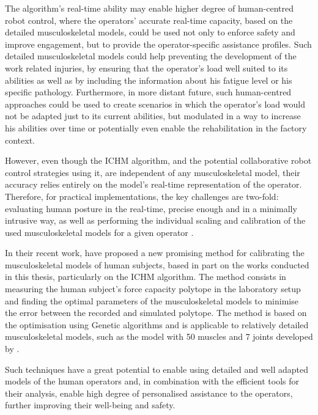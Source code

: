 The algorithm's real-time ability may enable higher degree of human-centred robot control, where the operators' accurate real-time capacity, based on the detailed musculoskeletal models, could be used not only to enforce safety and improve engagement, but to provide the operator-specific assistance profiles. Such detailed musculoskeletal models could help preventing the development of the work related injuries, by ensuring that the operator's load well suited to its abilities as well as by including the information about his fatigue level \cite{Bolghanabadi2014fatigue} or his specific pathology. Furthermore, in more distant future, such human-centred approaches could be used to create scenarios in which the operator's load would not be adapted just to its current abilities, but modulated in a way to increase his abilities over time or potentially even enable the rehabilitation in the factory context. 

However, even though the ICHM algorithm, and the potential collaborative robot control strategies using it, are independent of any musculoskeletal model, their accuracy relies entirely on the model's real-time representation of the operator. Therefore, for practical implementations, the key challenges are two-fold: evaluating human posture in the real-time, precise enough and in a minimally intrusive way, as well as performing the individual scaling and calibration of the used musculoskeletal models for a given operator \cite{correa20112782}.

In their recent work, \citet{laisne2023Genetic} have proposed a new promising method for calibrating the musculoskeletal models of human subjects, based in part on the works conducted in this thesis, particularly on the ICHM algorithm. The method consists in measuring the human subject's force capacity polytope in the laboratory setup and finding the optimal parameters of the musculoskeletal models to minimise the error between the recorded and simulated polytope. The method is based on the optimisation using Genetic algorithms and is applicable to relatively detailed musculoskeletal models, such as the model with 50 muscles and 7 joints developed by \citet{holzbaur2005model}.

Such techniques have a great potential to enable using detailed and well adapted models of the human operators and, in combination with the efficient tools for their analysis, enable high degree of personalised assistance to the operators, further improving their well-being and safety.


